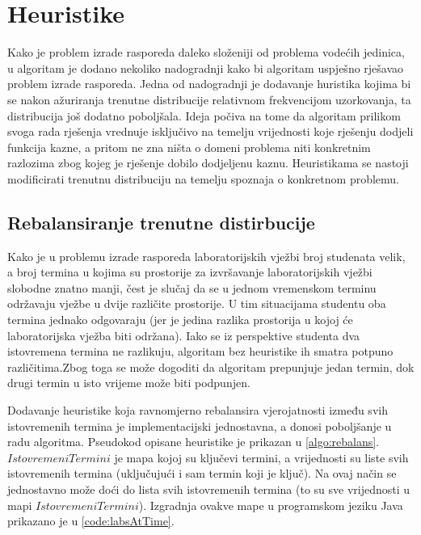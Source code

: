 \documentclass[times, utf8, zavrsni]{fer}
\begin{document}
\section{Heuristike}
\label{sec:heuristike}
Kako je problem izrade rasporeda daleko složeniji od problema vodećih jedinica, u algoritam je dodano nekoliko nadogradnji
kako bi algoritam uspješno rješavao problem izrade rasporeda. Jedna od nadogradnji je dodavanje huristika kojima bi
se nakon ažuriranja trenutne distribucije relativnom frekvencijom uzorkovanja, ta distribucija još dodatno poboljšala.
Ideja počiva na tome da algoritam prilikom svoga rada rješenja vrednuje isključivo na temelju vrijednosti koje rješenju
dodjeli funkcija kazne, a pritom ne zna ništa o domeni problema niti konkretnim razlozima zbog kojeg je rješenje dobilo
dodjeljenu kaznu. Heuristikama se nastoji modificirati trenutnu distribuciju na temelju spoznaja o konkretnom problemu.

\subsection{Rebalansiranje trenutne distirbucije}
Kako je u problemu izrade rasporeda laboratorijskih vježbi broj studenata velik, a broj termina u kojima su prostorije
za izvršavanje laboratorijskih vježbi slobodne znatno manji, čest je slučaj da se u jednom vremenskom terminu održavaju vježbe u dvije
različite prostorije. U tim situacijama studentu oba termina jednako odgovaraju (jer je jedina razlika prostorija u kojoj
će laboratorijska vježba biti održana). Iako se iz perspektive studenta dva istovremena termina ne razlikuju, algoritam
bez heuristike ih smatra potpuno različitima.Zbog toga se može dogoditi da algoritam prepunjuje jedan termin, dok drugi termin
u isto vrijeme može biti podpunjen.

Dodavanje heuristike koja ravnomjerno rebalansira vjerojatnosti između svih istovremenih
termina je implementacijski jednostavna, a donosi poboljšanje u radu algoritma. Pseudokod opisane heuristike je prikazan u
\ref{algo:rebalans}. $IstovremeniTermini$ je mapa kojoj su ključevi termini, a vrijednosti su liste svih istovremenih termina
(uključujući i sam termin koji je ključ). Na ovaj način se jednostavno može doći do lista svih istovremenih termina (to su sve vrijednosti
u mapi $IstovremeniTermini$). Izgradnja ovakve mape u programskom jeziku Java prikazano je u \ref{code:labsAtTime}.
\end{document}
